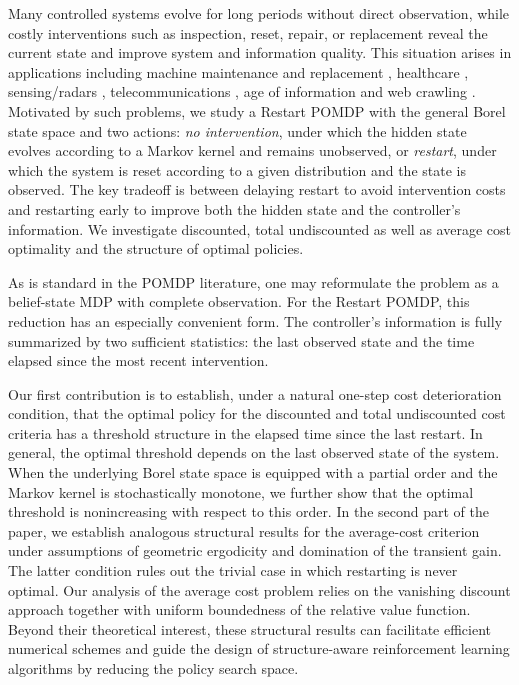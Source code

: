 \documentclass[letterpaper,10pt,conference]{ieeeconf}  %
\begin{document}
Many controlled systems evolve for long periods without direct observation, while costly interventions such as inspection, reset, repair, or replacement reveal the current state and improve system and information quality. This situation arises in applications including machine maintenance and replacement \cite{BP96,GMA05,W79}, healthcare \cite{Metal20}, sensing/radars \cite{V16}, telecommunications \cite{JS12,LWZ11,NM08}, age of information \cite{H18,TM24} and web crawling \cite{AB16}. Motivated by such problems, we study a Restart POMDP with the general Borel state space and two actions: {\it no intervention}, under which the hidden state evolves according to a Markov kernel and remains unobserved, or {\it restart}, under which the system is reset according to a given distribution and the state is observed. The key tradeoff is between delaying restart to avoid intervention costs and restarting early to improve both the hidden state and the controller’s information. We investigate discounted, total undiscounted as well as average cost optimality and the structure of optimal policies.


As is standard in the POMDP literature, one may reformulate the problem as a belief-state MDP with complete observation. For the Restart POMDP, this reduction has an especially convenient form. The controller’s information is fully summarized by two sufficient statistics: the last observed state and the time elapsed since the most recent intervention.

Our first contribution is to establish, under a natural one-step cost deterioration condition, that the optimal policy for the discounted and total undiscounted cost criteria has a threshold structure in the elapsed time since the last restart.
In general, the optimal threshold depends on the last observed state of the system. When the underlying Borel state space is equipped with a partial order and the Markov kernel is stochastically monotone, we further show that the optimal threshold is nonincreasing with respect to this order. In the second part of the paper, we establish analogous structural results for the average-cost criterion under assumptions of geometric ergodicity and domination of the transient gain. The latter condition rules out the trivial case in which restarting is never optimal. Our analysis of the average cost problem relies on the vanishing discount approach together with uniform boundedness of the relative value function. Beyond their theoretical interest, these structural results can facilitate efficient numerical schemes and guide the design of structure-aware reinforcement learning algorithms by reducing the policy search space.
\end{document}
